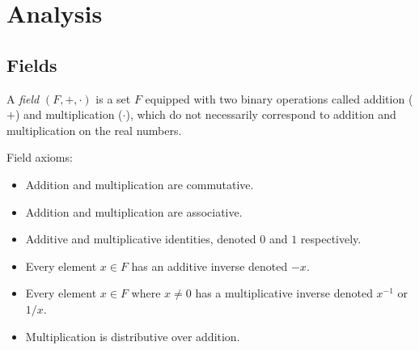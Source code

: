 
\chapter{Analysis}
\label{ch:analysis}

\section{Fields}

\begin{defn}
    A \emph{field} $(F, +, \cdot)$ is a set $F$ equipped with two binary operations called addition ($+$) and multiplication ($\cdot$), which do not necessarily correspond to addition and multiplication on the real numbers.

    Field axioms:
    \begin{itemize}
        \item Addition and multiplication are commutative.
        \item Addition and multiplication are associative.
        \item Additive and multiplicative identities, denoted $0$ and $1$ respectively.
        \item Every element $x \in F$ has an additive inverse denoted $-x$.
        \item Every element $x \in F$ where $x \neq 0$ has a multiplicative inverse denoted $x^{-1}$ or $1/x$.
        \item Multiplication is distributive over addition.
    \end{itemize}
\end{defn}

